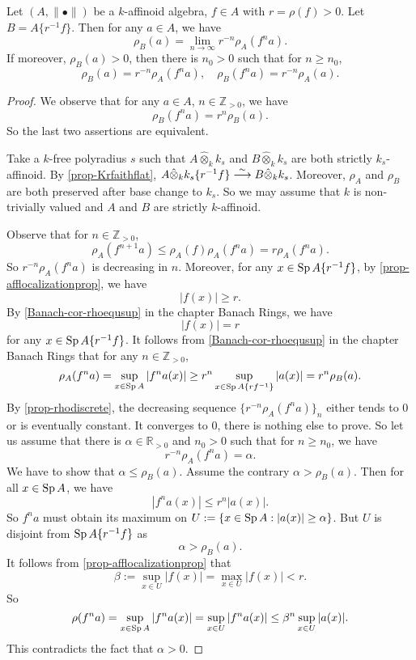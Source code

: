 \begin{lemma}\label{lma-rhoBandrhoA}
    Let $(A,\|\bullet\|)$ be a $k$-affinoid algebra, $f\in A$ with $r=\rho(f)>0$. Let $B=A\{r^{-1}f\}$. Then for any $a\in A$, we have
    \[
        \rho_B(a)=\lim_{n\to\infty}r^{-n}\rho_A(f^na).
    \]  
    If moreover, $\rho_B(a)>0$, then there is $n_0>0$ such that for $n\geq n_0$,
    \[
        \rho_B(a)=r^{-n}\rho_A(f^na),\quad   \rho_B(f^na)=r^{-n}\rho_A(a).
    \]
\end{lemma}
\begin{proof}
    We observe that for any $a\in A$, $n\in \mathbb{Z}_{>0}$, we have
    \[
        \rho_B(f^na)=r^n\rho_B(a).
    \]
    So the last two assertions are equivalent.

    Take a $k$-free polyradius $s$ such that $A\hat{\otimes}_k k_s$ and $B\hat{\otimes}_k k_s$ are both strictly $k_s$-affinoid. By \cref{prop-Krfaithflat}, $A\hat{\otimes}_k k_s\{r^{-1}f\}\stackrel{\sim}{\longrightarrow} B\hat{\otimes}_k k_s$. Moreover, $\rho_A$ and $\rho_B$ are both preserved after base change to $k_s$. So we may assume that $k$ is non-trivially valued and $A$ and $B$ are strictly $k$-affinoid.

    Observe that  for $n\in \mathbb{Z}_{>0}$, 
    \[
        \rho_A(f^{n+1}a)\leq \rho_A(f)\rho_A(f^na)=r   \rho_A(f^na). 
    \]
    So $r^{-n}\rho_A(f^{n}a)$ is decreasing in $n$. Moreover, for any $x\in \operatorname{Sp} A\{r^{-1}f\}$, by \cref{prop-afflocalizationprop}, we have
    \[
        |f(x)|\geq r. 
    \]
    By \cref{Banach-cor-rhoequsup} in the chapter Banach Rings, we have
    \[
        |f(x)|=r  
    \]
    for any $x\in \operatorname{Sp} A\{r^{-1}f\}$. It follows from \cref{Banach-cor-rhoequsup} in the chapter Banach Rings that for any $n\in \mathbb{Z}_{>0}$,
    \[
        \rho_A(f^na)=\sup_{x\in \operatorname{Sp} A}|f^na(x)|\geq  r^n\sup_{x\in \operatorname{Sp} A\{rf^{-1}\}}|a(x)|=r^n\rho_B(a). 
    \]
    By \cref{prop-rhodiscrete}, the decreasing sequence $\{r^{-n}\rho_A(f^na)\}_n$ either tends to $0$ or is eventually constant. It converges to $0$, there is nothing else to prove. So let us assume that there is $\alpha\in \mathbb{R}_{>0}$ and $n_0>0$ such that for $n\geq n_0$, we have
    \[
        r^{-n}\rho_A(f^na)=\alpha.  
    \]
    We have to show that $\alpha\leq \rho_B(a)$. Assume the contrary $\alpha>\rho_B(a)$. Then for all $x\in \operatorname{Sp} A$, we have
    \[
        |f^na(x)|\leq r^n|a(x)|.  
    \] 
    So $f^na$ must obtain its maximum on $U:=\{x\in \operatorname{Sp} A: |a(x)|\geq \alpha\}$. But $U$ is disjoint from $\operatorname{Sp} A\{r^{-1}f\}$ as
    \[
        \alpha>\rho_B(a).
    \]
    It follows from \cref{prop-afflocalizationprop} that 
    \[
        \beta:=\sup_{x\in U}|f(x)|=\max_{x\in U}|f(x)|<r.  
    \]
    So
    \[
        \rho(f^na)=\sup_{x\in \operatorname{Sp} A}|f^na(x)|=\sup_{x\in U}|f^na(x)|\leq \beta^n \sup_{x\in U}|a(x)|.   
    \]
    This contradicts the fact that $\alpha>0$.
\end{proof}

